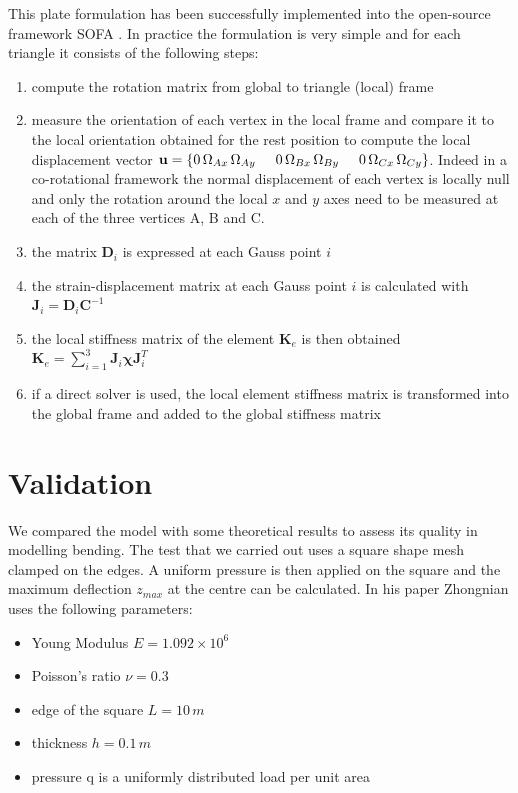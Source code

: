 \documentclass{llncs}
\begin{document}
This plate formulation has been successfully implemented into the open-source framework SOFA \cite{SOFA}. In practice the formulation is very simple and for each triangle it consists of the following steps:

\begin{enumerate}
\item compute the rotation matrix from global to triangle (local) frame
\item measure the orientation of each vertex in the local frame and compare it to the local orientation obtained for the rest position to compute the local displacement vector $\textbf{u} = \left\{0 \, \Omega _{Ax} \, \Omega _{Ay}  \hspace{0.5cm} 0 \, \Omega _{Bx} \, \Omega _{By}  \hspace{0.5cm}  0 \, \Omega _{Cx} \, \Omega _{Cy} \right\}$. Indeed in a co-rotational framework the normal displacement of each vertex is locally null and only the rotation around the local $x$ and $y$ axes need to be measured at each of the three vertices A, B and C.
\item the matrix $\textbf{D}_i$ is expressed at each Gauss point $i$
\item the strain-displacement matrix at each Gauss point $i$ is calculated with $\textbf{J}_i = \textbf{D}_i \textbf{C}^{-1}$
\item the local stiffness matrix of the element $\textbf{K}_e$ is then obtained $\textbf{K}_e = \displaystyle{\sum^3_{i=1}} \textbf{J}_i \boldsymbol\chi \textbf{J}_i^T$
\item if a direct solver is used, the local element stiffness matrix is transformed into the global frame and added to the global stiffness matrix
\end{enumerate}

\section{Validation}

We compared the model with some theoretical results to assess its quality in modelling bending. The test that we carried out uses a square shape mesh clamped on the edges. A uniform pressure is then applied on the square and the maximum deflection $z_{max}$ at the centre can be calculated. In his paper Zhongnian \cite{Zhongnian86} uses the following parameters:
\begin{itemize}
 \item Young Modulus $E = 1.092 \times 10^6$
 \item Poisson's ratio $\nu = 0.3$
 \item edge of the square $L = 10\,m$
 \item thickness $h = 0.1\,m$
 \item pressure q is a uniformly distributed load per unit area
\end{itemize}
\end{document}
